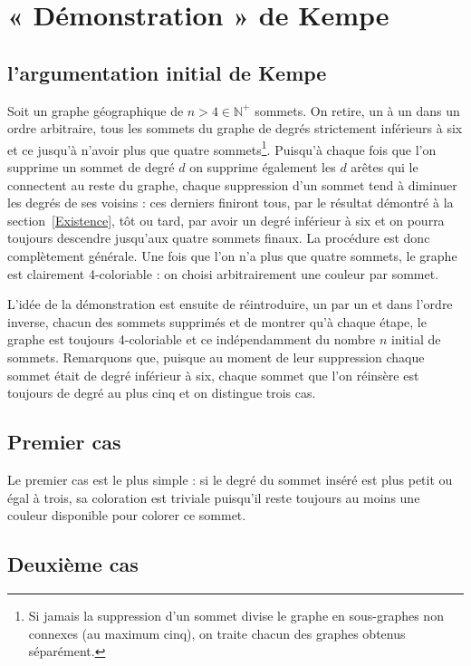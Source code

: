 \section{« Démonstration » de Kempe}\label{sec:Kempe}
\subsection{l'argumentation initial de Kempe}

Soit un graphe géographique de $n>4\in\mathbb{N}^+$ sommets. On retire, un à un dans un ordre arbitraire, tous les sommets du graphe de degrés strictement inférieurs à six et ce jusqu'à n'avoir plus que quatre sommets\footnote{Si jamais la suppression d'un sommet divise le graphe en sous-graphes non connexes (au maximum cinq), on traite chacun des graphes obtenus séparément.}. Puisqu'à chaque fois que l'on supprime un sommet de degré $d$ on supprime également les $d$ arêtes qui le connectent au reste du graphe, chaque suppression d'un sommet tend à diminuer les degrés de ses voisins : ces derniers finiront tous, par le résultat démontré à la section~\ref{Existence}, tôt ou tard, par avoir un degré inférieur à six et on pourra toujours descendre jusqu'aux quatre sommets finaux. La procédure est donc complètement générale. Une fois que l'on n'a plus que quatre sommets, le graphe est clairement 4-coloriable : on choisi arbitrairement une couleur par sommet.

L'idée de la démonstration est ensuite de réintroduire, un par un et dans l'ordre inverse, chacun des sommets supprimés et de montrer qu'à chaque étape, le graphe est toujours 4-coloriable et ce indépendamment du nombre $n$ initial de sommets. Remarquons que, puisque au moment de leur suppression chaque sommet était de degré inférieur à six, chaque sommet que l'on réinsère est toujours de degré au plus cinq et on distingue trois cas.

\subsection*{Premier cas}

Le premier cas est le plus simple : si le degré du sommet inséré est plus petit ou égal à trois, sa coloration est triviale puisqu'il reste toujours au moins une couleur disponible pour colorer ce sommet.

\subsection*{Deuxième cas}

